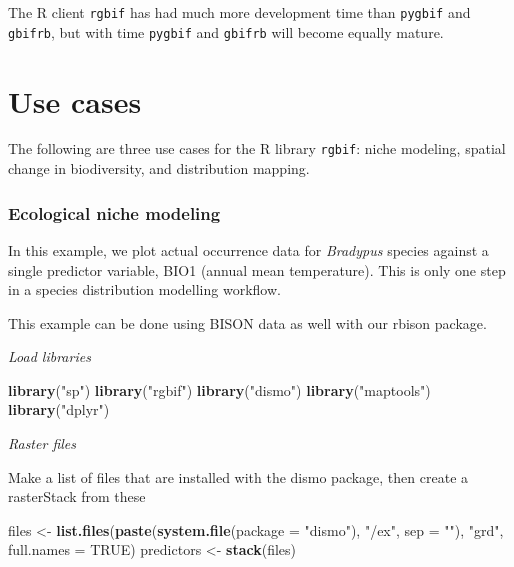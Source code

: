 \documentclass[author-year, review, 11pt]{components/elsarticle} %
\newenvironment{Shaded}{\begin{snugshade}}{\end{snugshade}}
\newcommand{\KeywordTok}[1]{\textcolor[rgb]{0.13,0.29,0.53}{\textbf{#1}}}
\newcommand{\DataTypeTok}[1]{\textcolor[rgb]{0.13,0.29,0.53}{#1}}
\newcommand{\StringTok}[1]{\textcolor[rgb]{0.31,0.60,0.02}{#1}}
\newcommand{\OtherTok}[1]{\textcolor[rgb]{0.56,0.35,0.01}{#1}}
\newcommand{\NormalTok}[1]{#1}
\begin{document}
The R client \texttt{rgbif} has had much more development time than
\texttt{pygbif} and \texttt{gbifrb}, but with time \texttt{pygbif} and
\texttt{gbifrb} will become equally mature.

\section{Use cases}\label{use-cases}

The following are three use cases for the R library \texttt{rgbif}:
niche modeling, spatial change in biodiversity, and distribution
mapping.

\subsubsection{Ecological niche
modeling}\label{ecological-niche-modeling}

In this example, we plot actual occurrence data for \emph{Bradypus}
species against a single predictor variable, BIO1 (annual mean
temperature). This is only one step in a species distribution modelling
workflow.

This example can be done using BISON data as well with our rbison
package.

\emph{Load libraries}

\begin{Shaded}
\begin{Highlighting}[]
\KeywordTok{library}\NormalTok{(}\StringTok{"sp"}\NormalTok{)}
\KeywordTok{library}\NormalTok{(}\StringTok{"rgbif"}\NormalTok{)}
\KeywordTok{library}\NormalTok{(}\StringTok{"dismo"}\NormalTok{)}
\KeywordTok{library}\NormalTok{(}\StringTok{"maptools"}\NormalTok{)}
\KeywordTok{library}\NormalTok{(}\StringTok{"dplyr"}\NormalTok{)}
\end{Highlighting}
\end{Shaded}

\emph{Raster files}

Make a list of files that are installed with the dismo package, then
create a rasterStack from these

\begin{Shaded}
\begin{Highlighting}[]
\NormalTok{files <-}\StringTok{ }\KeywordTok{list.files}\NormalTok{(}\KeywordTok{paste}\NormalTok{(}\KeywordTok{system.file}\NormalTok{(}\DataTypeTok{package =} \StringTok{"dismo"}\NormalTok{), }\StringTok{"/ex"}\NormalTok{, }\DataTypeTok{sep =} \StringTok{""}\NormalTok{),}
                    \StringTok{"grd"}\NormalTok{, }\DataTypeTok{full.names =} \OtherTok{TRUE}\NormalTok{)}
\NormalTok{predictors <-}\StringTok{ }\KeywordTok{stack}\NormalTok{(files)}
\end{Highlighting}
\end{Shaded}
\end{document}

